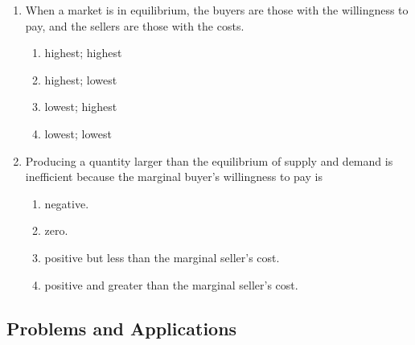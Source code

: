 \documentclass{article}
\begin{document}
\begin{enumerate}
\begin{enumerate}
	\end{enumerate}
	
\item When a market is in equilibrium, the buyers are those with the \underline{\phantom{xxxxxxxxxx}} willingness to pay, and the sellers are those with the \underline{\phantom{xxxxxxxxxx}} costs.

	\begin{enumerate}
	
	\item highest; highest
	
	\item highest; lowest
	
	\item lowest; highest
	
	\item lowest; lowest
	
	\end{enumerate}
	
\newpage
	
\item Producing a quantity larger than the equilibrium of supply and demand is inefficient because the marginal buyer's willingness to pay is 

	\begin{enumerate}
	
	\item negative.
	
	\item zero.
	
	\item positive but less than the marginal seller's cost.
	
	\item positive and greater than the marginal seller's cost.
	
	\end{enumerate}

\end{enumerate}

\subsection*{Problems and Applications}
\end{document}
